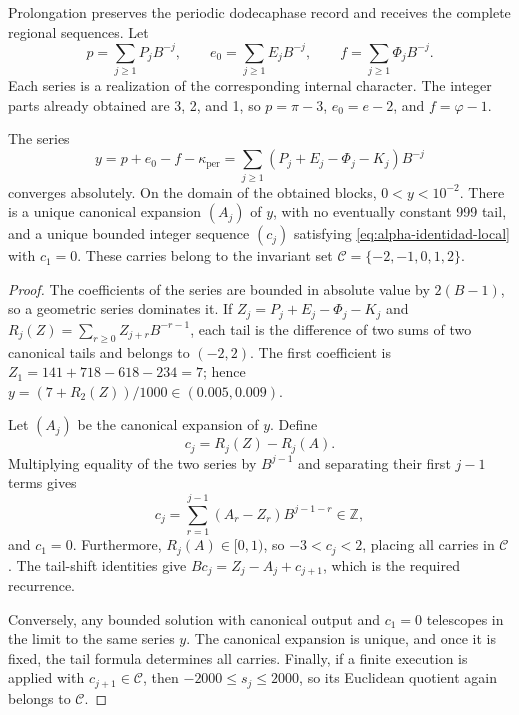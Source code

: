 Prolongation preserves the periodic dodecaphase record and receives the complete
regional sequences. Let
\[
 p=\sum_{j\geq1}P_jB^{-j},\qquad
 e_0=\sum_{j\geq1}E_jB^{-j},\qquad
 f=\sum_{j\geq1}\Phi_jB^{-j}.
\]
Each series is a realization of the corresponding internal character.
The integer parts already obtained are 3, 2, and 1, so
\(p=\pi-3\), \(e_0=e-2\), and
\(f=\varphi-1\).

\begin{proposition}
\label{prop:alpha-normalizacion}
The series
\begin{equation}
 y=p+e_0-f-\kappa_{\mathrm{per}}
   =\sum_{j\geq1}(P_j+E_j-\Phi_j-K_j)B^{-j}
 \label{eq:alpha-serie}
\end{equation}
converges absolutely. On the domain of the obtained blocks,
\(0<y<10^{-2}\). There is a unique canonical expansion \((A_j)\) of
\(y\), with no eventually constant 999 tail, and a unique bounded integer
sequence \((c_j)\) satisfying \eqref{eq:alpha-identidad-local} with
\(c_1=0\). These carries belong to the invariant set
\(\mathcal C=\{-2,-1,0,1,2\}\).
\end{proposition}

\begin{proof}
The coefficients of the series are bounded in absolute value by \(2(B-1)\),
so a geometric series dominates it. If
\(Z_j=P_j+E_j-\Phi_j-K_j\) and
\(R_j(Z)=\sum_{r\geq0}Z_{j+r}B^{-r-1}\), each tail is the difference
of two sums of two canonical tails and belongs to \((-2,2)\).
The first coefficient is
\(Z_1=141+718-618-234=7\); hence
\(y=(7+R_2(Z))/1000\in(0.005,0.009)\).

Let \((A_j)\) be the canonical expansion of \(y\). Define
\[
 c_j=R_j(Z)-R_j(A).
\]
Multiplying equality of the two series by \(B^{j-1}\) and separating
their first \(j-1\) terms gives
\[
 c_j=\sum_{r=1}^{j-1}(A_r-Z_r)B^{j-1-r}\in\mathbb Z,
\]
and \(c_1=0\). Furthermore, \(R_j(A)\in[0,1)\), so
\(-3<c_j<2\), placing all carries in \(\mathcal C\).
The tail-shift identities give
\(Bc_j=Z_j-A_j+c_{j+1}\), which is the required recurrence.

Conversely, any bounded solution with canonical output and
\(c_1=0\) telescopes in the limit to the same series \(y\). The canonical
expansion is unique, and once it is fixed, the tail formula determines
all carries. Finally, if a finite execution is applied with
\(c_{j+1}\in\mathcal C\), then \(-2000\leq s_j\leq2000\),
so its Euclidean quotient again belongs to \(\mathcal C\).
\end{proof}

